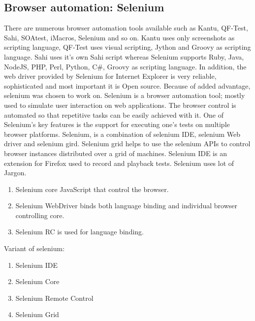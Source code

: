\documentclass[article,type=msc,colorback,accentcolor=tud9c,twoside,11pt]{tudthesis}
\begin{document}
\subsection{Browser automation: Selenium}
There are numerous browser automation tools available such as Kantu, QF-Test, Sahi, SOAtest, iMacros, Selenium and so on. Kantu uses only screenshots as scripting language, QF-Test uses visual scripting, Jython and Groovy as scripting language. Sahi uses it's own Sahi script whereas Selenium supports Ruby, Java, NodeJS, PHP, Perl, Python, C\#, Groovy as scripting language. In addition, the web driver provided by Selenium for Internet Explorer is very reliable, sophisticated and most important it is Open source. Because of added advantage, selenium was chosen to work on.
Selenium\cite{AutomationTestingAnIntroductiontoSelenium} is a browser automation tool; mostly used to simulate user interaction on web applications. The browser control is automated so that repetitive tasks can be easily achieved with it. One of Selenium's key features is the support for executing one's tests on multiple browser platforms. Selenium,  is a combination of selenium IDE, selenium Web driver and selenium gird. Selenium grid helps to use the selenium APIs to control browser instances distributed over a grid of machines. Selenium IDE is an extension for Firefox used to record and playback tests. Selenium uses lot of Jargon.

\begin{enumerate}
\item Selenium core JavaScript that control the browser.
\item Selenium WebDriver binds both language binding and individual browser controlling core.
\item Selenium RC is used for language binding.
\end{enumerate}


Variant of selenium:
\begin{enumerate}
\item Selenium IDE
\item Selenium Core
\item Selenium Remote Control
\item Selenium Grid
\end{enumerate}
\end{document}
